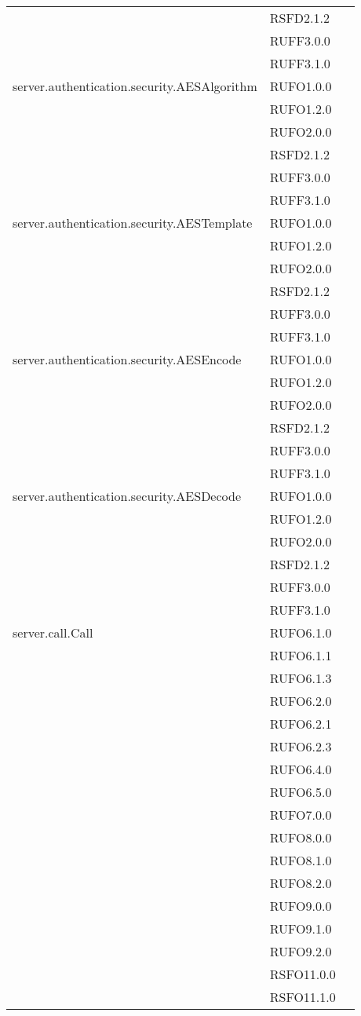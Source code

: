 \begin{center}
\begin{longtable}{lp{}l}
 & RSFD2.1.2 \\
 & RUFF3.0.0 \\
 & RUFF3.1.0 \\
server.authentication.security.AESAlgorithm & RUFO1.0.0 \\
 & RUFO1.2.0 \\
 & RUFO2.0.0 \\
 & RSFD2.1.2 \\
 & RUFF3.0.0 \\
 & RUFF3.1.0 \\
server.authentication.security.AESTemplate & RUFO1.0.0 \\
 & RUFO1.2.0 \\
 & RUFO2.0.0 \\
 & RSFD2.1.2 \\
 & RUFF3.0.0 \\
 & RUFF3.1.0 \\
server.authentication.security.AESEncode & RUFO1.0.0 \\
 & RUFO1.2.0 \\
 & RUFO2.0.0 \\
 & RSFD2.1.2 \\
 & RUFF3.0.0 \\
 & RUFF3.1.0 \\
server.authentication.security.AESDecode & RUFO1.0.0 \\
 & RUFO1.2.0 \\
 & RUFO2.0.0 \\
 & RSFD2.1.2 \\
 & RUFF3.0.0 \\
 & RUFF3.1.0 \\
server.call.Call  & RUFO6.1.0 \\
 & RUFO6.1.1 \\
 & RUFO6.1.3 \\
 & RUFO6.2.0 \\
 & RUFO6.2.1 \\
 & RUFO6.2.3 \\
 & RUFO6.4.0 \\
 & RUFO6.5.0 \\
 & RUFO7.0.0 \\
 & RUFO8.0.0 \\
 & RUFO8.1.0 \\
 & RUFO8.2.0 \\
 & RUFO9.0.0 \\
 & RUFO9.1.0 \\
 & RUFO9.2.0 \\
 & RSFO11.0.0 \\
 & RSFO11.1.0 \\

\end{longtable}
\end{center}

